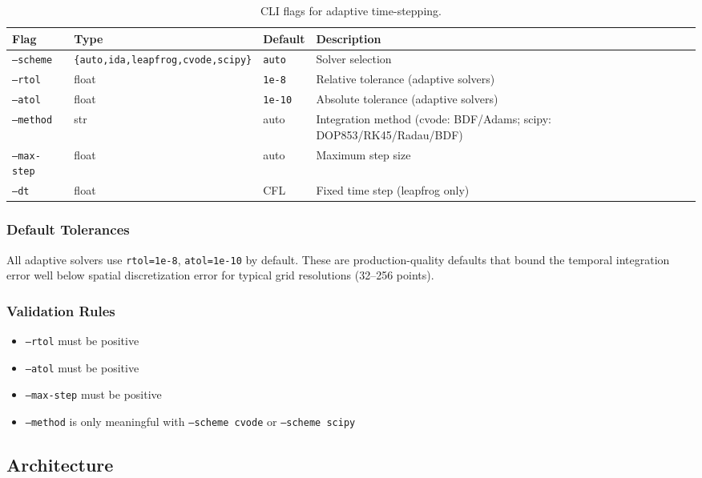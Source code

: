 \begin{table}[htbp]
\centering
\caption{CLI flags for adaptive time-stepping.}
\label{tab:cli-flags}
\begin{tabular}{@{}llll@{}}
\toprule
Flag & Type & Default & Description \\
\midrule
\texttt{--scheme} & \texttt{\{auto,ida,leapfrog,cvode,scipy\}} & \texttt{auto} & Solver selection \\
\texttt{--rtol} & float & \texttt{1e-8} & Relative tolerance (adaptive solvers) \\
\texttt{--atol} & float & \texttt{1e-10} & Absolute tolerance (adaptive solvers) \\
\texttt{--method} & str & auto & Integration method (cvode: BDF/Adams; scipy: DOP853/RK45/Radau/BDF) \\
\texttt{--max-step} & float & auto & Maximum step size \\
\texttt{--dt} & float & CFL & Fixed time step (leapfrog only) \\
\bottomrule
\end{tabular}
\end{table}

\subsubsection{Default Tolerances}
\label{sec:default-tolerances}

All adaptive solvers use \texttt{rtol=1e-8}, \texttt{atol=1e-10} by default. These are
production-quality defaults that bound the temporal integration error well
below spatial discretization error for typical grid resolutions (32--256
points).

\subsubsection{Validation Rules}
\label{sec:validation-rules}

\begin{itemize}
  \item \texttt{--rtol} must be positive
  \item \texttt{--atol} must be positive
  \item \texttt{--max-step} must be positive
  \item \texttt{--method} is only meaningful with \texttt{--scheme cvode} or \texttt{--scheme scipy}
\end{itemize}

\subsection{Architecture}
\label{sec:at-architecture}

